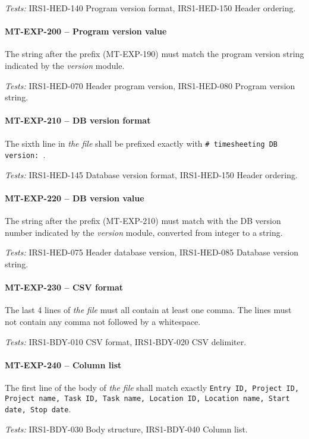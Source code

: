 \textit{Tests: } IRS1-HED-140 Program version format, IRS1-HED-150 Header
ordering.

\paragraph{MT-EXP-200 -- Program version value}
The string after the prefix (MT-EXP-190) must match the program version
string indicated by the \emph{version} module.

\textit{Tests: } IRS1-HED-070 Header program version, IRS1-HED-080 Program
version string.

\paragraph{MT-EXP-210 -- DB version format}
The sixth line in \emph{the file} shall be prefixed exactly with
\lstinline{# timesheeting DB version: }.

\textit{Tests: } IRS1-HED-145 Database version format, IRS1-HED-150 Header
ordering.

\paragraph{MT-EXP-220 -- DB version value}
The string after the prefix (MT-EXP-210) must match with the \gls{DB}
version number indicated by the \emph{version} module, converted
from integer to a string.

\textit{Tests: } IRS1-HED-075 Header database version, IRS1-HED-085 Database
version string.

\paragraph{MT-EXP-230 -- CSV format}
The last 4 lines of \emph{the file} must all contain at least one comma.
The lines must not contain any comma not followed by a whitespace.

\textit{Tests: } IRS1-BDY-010 CSV format, IRS1-BDY-020 CSV delimiter.

\paragraph{MT-EXP-240 -- Column list}
The first line of the body of \emph{the file} shall match exactly
\lstinline{Entry ID, Project ID, Project name, Task ID, Task name, Location ID, Location name, Start date, Stop date}.

\textit{Tests: } IRS1-BDY-030 Body structure, IRS1-BDY-040 Column list.

